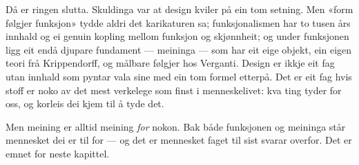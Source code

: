 Då er ringen slutta. Skuldinga var at design kviler på ein tom setning. Men «form følgjer funksjon» tydde aldri det karikaturen sa; funksjonalismen har to tusen års innhald og ei genuin kopling mellom funksjon og skjønnheit; og under funksjonen ligg eit endå djupare fundament — meininga — som har eit eige objekt, ein eigen teori frå Krippendorff, og målbare følgjer hos Verganti. Design er ikkje eit fag utan innhald som pyntar vala sine med ein tom formel etterpå. Det er eit fag hvis stoff er noko av det mest verkelege som finst i menneskelivet: kva ting tyder for oss, og korleis dei kjem til å tyde det.

\vignett

Men meining er alltid meining \emph{for} nokon. Bak både funksjonen og meininga står mennesket dei er til for — og det er mennesket faget til sist svarar overfor. Det er emnet for neste kapittel.

